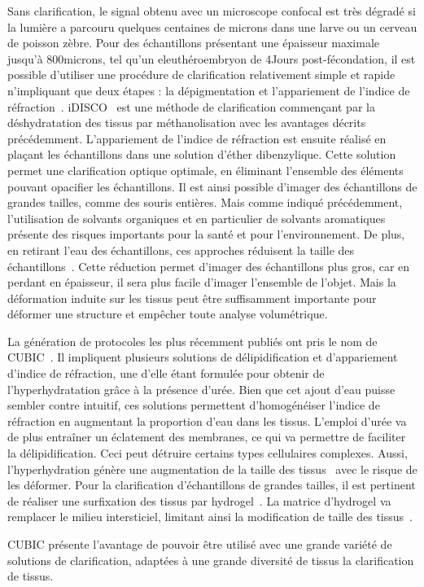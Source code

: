 \documentclass[\main/main.tex]{subfiles}
\begin{document}
Sans clarification, le signal obtenu avec un microscope confocal est très dégradé si la lumière a parcouru quelques centaines de microns dans une larve ou un cerveau de poisson zèbre.
Pour des échantillons présentant une épaisseur maximale jusqu'à 800microns, tel qu'un eleuthéroembryon de 4Jours post-fécondation, il est possible d'utiliser une procédure de clarification relativement simple et rapide n'impliquant que deux étapes : la dépigmentation et l'appariement de l'indice de réfraction~\cite{affaticati_2018}.
iDISCO~\cite{renier_2014} est une méthode de clarification commençant par la déshydratation des tissus par méthanolisation avec les avantages décrits précédemment. 
%
L'appariement de l'indice de réfraction est ensuite réalisé en plaçant les échantillons dans une solution d'éther dibenzylique.
%
Cette solution permet une clarification optique optimale, en éliminant l'ensemble des éléments pouvant opacifier les échantillons.
%
Il est ainsi possible d'imager des échantillons de grandes tailles, comme des souris entières.
Mais comme indiqué précédemment, l'utilisation de solvants organiques et en particulier de solvants aromatiques présente des risques importants pour la santé et pour l'environnement.
%
De plus, en retirant l'eau des échantillons, ces approches réduisent la taille des échantillons~\cite{frtaud_2017}.
%
Cette réduction permet d'imager des échantillons plus gros, car en perdant en épaisseur, il sera plus facile d'imager l'ensemble de l'objet.
%
Mais la déformation induite sur les tissus peut être suffisamment importante pour déformer une structure et empêcher toute analyse volumétrique.


La génération de protocoles les plus récemment publiés ont pris le nom de CUBIC~\cite{susaki_2014,susaki_2015}.
%
Il impliquent plusieurs solutions de délipidification et d'appariement d'indice de réfraction, une d'elle étant formulée pour obtenir de l'hyperhydratation grâce à la présence d'urée. Bien que cet ajout d'eau puisse sembler contre intuitif, ces solutions permettent d'homogénéiser l'indice de réfraction en augmentant la proportion d'eau dans les tissus.
L'emploi d'urée va de plus entraîner un éclatement des membranes, ce qui va permettre de faciliter la délipidification. Ceci peut détruire certains types cellulaires complexes. Aussi, l'hyperhydration génère une augmentation de la taille des tissus~\cite{frtaud_2017} avec le risque de les déformer.
%
Pour la clarification d'échantillons de grandes tailles, il est pertinent de réaliser une surfixation des tissus par hydrogel~\cite{chung_2013,richardson_2020}.
%
La matrice d'hydrogel va remplacer le milieu intersticiel, limitant ainsi la modification de taille des tissus~\cite{frtaud_2017}.

%
CUBIC présente l'avantage de pouvoir être utilisé avec une grande variété de solutions de clarification, adaptées à une grande diversité de tissus la clarification de tissus.
%
\end{document}
